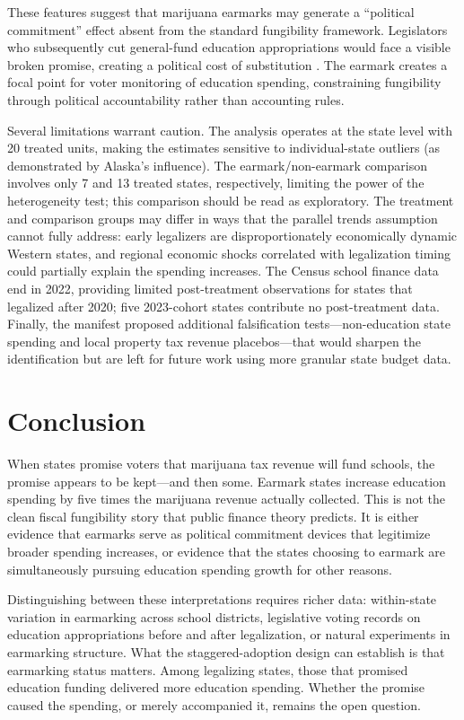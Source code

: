 \documentclass[12pt]{article}
\begin{document}
These features suggest that marijuana earmarks may generate a ``political commitment'' effect absent from the standard fungibility framework. Legislators who subsequently cut general-fund education appropriations would face a visible broken promise, creating a political cost of substitution \citep{peltzman1992voters, anderson2019does}. The earmark creates a focal point for voter monitoring of education spending, constraining fungibility through political accountability rather than accounting rules.

Several limitations warrant caution. The analysis operates at the state level with 20 treated units, making the estimates sensitive to individual-state outliers (as demonstrated by Alaska's influence). The earmark/non-earmark comparison involves only 7 and 13 treated states, respectively, limiting the power of the heterogeneity test; this comparison should be read as exploratory. The treatment and comparison groups may differ in ways that the parallel trends assumption cannot fully address: early legalizers are disproportionately economically dynamic Western states, and regional economic shocks correlated with legalization timing could partially explain the spending increases. The Census school finance data end in 2022, providing limited post-treatment observations for states that legalized after 2020; five 2023-cohort states contribute no post-treatment data. Finally, the manifest proposed additional falsification tests---non-education state spending and local property tax revenue placebos---that would sharpen the identification but are left for future work using more granular state budget data.


\section{Conclusion}

When states promise voters that marijuana tax revenue will fund schools, the promise appears to be kept---and then some. Earmark states increase education spending by five times the marijuana revenue actually collected. This is not the clean fiscal fungibility story that public finance theory predicts. It is either evidence that earmarks serve as political commitment devices that legitimize broader spending increases, or evidence that the states choosing to earmark are simultaneously pursuing education spending growth for other reasons.

Distinguishing between these interpretations requires richer data: within-state variation in earmarking across school districts, legislative voting records on education appropriations before and after legalization, or natural experiments in earmarking structure. What the staggered-adoption design can establish is that earmarking status matters. Among legalizing states, those that promised education funding delivered more education spending. Whether the promise caused the spending, or merely accompanied it, remains the open question.
\end{document}
